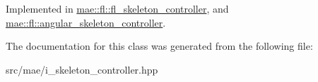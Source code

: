 Implemented in \hyperlink{classmae_1_1fl_1_1fl__skeleton__controller_a0775153d13e802f14d2df3b5bcb51ff1}{mae\-::fl\-::fl\-\_\-skeleton\-\_\-controller}, and \hyperlink{classmae_1_1fl_1_1angular__skeleton__controller_afae922566ff1d48db88538bd4b0c0d19}{mae\-::fl\-::angular\-\_\-skeleton\-\_\-controller}.



The documentation for this class was generated from the following file\-:\begin{DoxyCompactItemize}
\item 
src/mae/i\-\_\-skeleton\-\_\-controller.\-hpp\end{DoxyCompactItemize}
